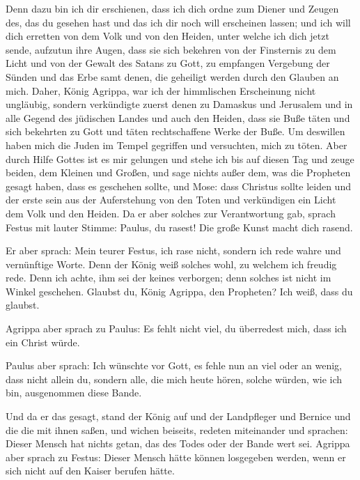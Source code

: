  Denn dazu bin ich dir erschienen, dass ich dich ordne
zum Diener und Zeugen des, das du gesehen hast und das ich dir noch will
erscheinen lassen;  und ich will dich erretten von dem
Volk und von den Heiden, unter welche ich dich jetzt sende,
 aufzutun ihre Augen, dass sie sich bekehren von der
Finsternis zu dem Licht und von der Gewalt des Satans zu Gott, zu
empfangen Vergebung der Sünden und das Erbe samt denen, die geheiligt
werden durch den Glauben an mich.  Daher, König Agrippa,
war ich der himmlischen Erscheinung nicht ungläubig, 
sondern verkündigte zuerst denen zu Damaskus und Jerusalem und in alle
Gegend des jüdischen Landes und auch den Heiden, dass sie Buße täten und
sich bekehrten zu Gott und täten rechtschaffene Werke der Buße.
 Um deswillen haben mich die Juden im Tempel gegriffen
und versuchten, mich zu töten.  Aber durch Hilfe Gottes
ist es mir gelungen und stehe ich bis auf diesen Tag und zeuge beiden,
dem Kleinen und Großen, und sage nichts außer dem, was die Propheten
gesagt haben, dass es geschehen sollte, und Mose:  dass
Christus sollte leiden und der erste sein aus der Auferstehung von den
Toten und verkündigen ein Licht dem Volk und den Heiden. 
Da er aber solches zur Verantwortung gab, sprach Festus mit lauter
Stimme: Paulus, du rasest! Die große Kunst macht dich rasend.

 Er aber sprach: Mein teurer Festus, ich rase nicht,
sondern ich rede wahre und vernünftige Worte.  Denn der
König weiß solches wohl, zu welchem ich freudig rede. Denn ich achte,
ihm sei der keines verborgen; denn solches ist nicht im Winkel
geschehen.  Glaubst du, König Agrippa, den Propheten? Ich
weiß, dass du glaubst.

 Agrippa aber sprach zu Paulus: Es fehlt nicht viel, du
überredest mich, dass ich ein Christ würde.

 Paulus aber sprach: Ich wünschte vor Gott, es fehle nun
an viel oder an wenig, dass nicht allein du, sondern alle, die mich
heute hören, solche würden, wie ich bin, ausgenommen diese Bande.

 Und da er das gesagt, stand der König auf und der
Landpfleger und Bernice und die die mit ihnen saßen,  und
wichen beiseits, redeten miteinander und sprachen: Dieser Mensch hat
nichts getan, das des Todes oder der Bande wert sei. 
Agrippa aber sprach zu Festus: Dieser Mensch hätte können losgegeben
werden, wenn er sich nicht auf den Kaiser berufen hätte.

